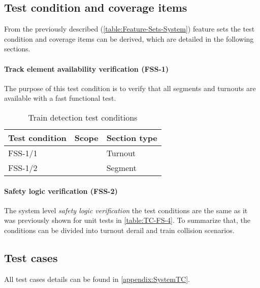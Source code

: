 \subsection{Test condition and coverage items}
From the previously described (\ref{table:Feature-Sets-System}) feature sets the test condition and coverage items can be derived, which are detailed in the following sections.
\paragraph{Track element availability verification (FSS-1)} The purpose of this test condition is to verify that all segments and turnouts are available with a fast functional test. 
\begin{table}[H]
	\caption{Train detection test conditions}
	\label{table:TC-FSS-1}
	\begin{center}
		\renewcommand{\arraystretch}{1.8}
		\begin{tabu} 
			to 0.9 \textwidth
			{  X[c] X[c] X[c] }
			\toprule
			Test condition & Scope                      & Section type \\ \midrule
			FSS-1/1        &  & Turnout      \\
			FSS-1/2        &                            & Segment      \\ \bottomrule
		\end{tabu}
	\end{center}
\end{table}
\paragraph{Safety logic verification (FSS-2)} The system level \textit{safety logic verification} the test conditions are the same as it was previously shown for unit tests in \autoref{table:TC-FS-4}. To summarize that, the conditions can be divided into turnout derail and train collision scenarios.

\subsection{Test cases} All test cases details can be found in \autoref{appendix:SystemTC}.
